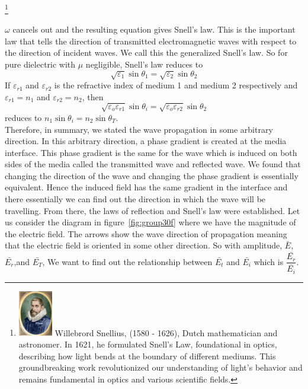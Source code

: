 \footnote{
\includegraphics[height=20mm]{graphics/snells} Willebrord Snellius, (1580 - 1626), Dutch mathematician and astronomer. In 1621, he formulated Snell's Law, foundational in optics, describing how light bends at the boundary of different mediums. This groundbreaking work revolutionized our understanding of light's behavior and remains fundamental in optics and various scientific fields.
}

$\omega$ cancels out and the resulting equation gives Snell's law. This is the important law that tells the direction of transmitted electromagnetic waves with respect to the direction of incident waves. We call this the generalized Snell's law. So for pure dielectric with $\mu$ negligible, Snell's law reduces to
$$\sqrt{\varepsilon_1}\sin\theta_1=\sqrt{\varepsilon_2}\sin\theta_2$$
\begin{equation}\end{equation}
If $\varepsilon_{r1}$ and $\varepsilon_{r2}$ is the refractive index of medium 1 and medium 2 respectively and $\varepsilon_{r1}=n_1$ and $\varepsilon_{r2}=n_2$, then
$$\sqrt{\varepsilon_o\varepsilon_{r1}}\sin\theta_i=\sqrt{\varepsilon_o\varepsilon_{r2}}\sin\theta_2$$
\begin{equation}\end{equation}
reduces to 
$n_1\sin\theta_i=n_2\sin\theta_T$. 
\begin{equation}\end{equation}
Therefore, in summary, we stated the wave propagation in some arbitrary direction. In this arbitrary direction, a phase gradient is created at the media interface. This phase gradient is the same for the wave which is induced on both sides of the media called the transmitted wave and reflected wave. We found that changing the direction of the wave and changing the phase gradient is essentially equivalent. Hence the induced field has the same gradient in the interface and there essentially we can find out the direction in which the wave will be travelling. From there, the laws of reflection and Snell's law were established. Let us consider the diagram in figure~\ref{fig:group30f} where we have the magnitude of the electric field. The arrows show the wave direction of propagation meaning that the electric field is oriented in some other direction. So with amplitude, $\bar{E}$, $\bar{E_r}$,and $\bar{E_T}$, We want to find out the relationship between $\bar{E_t}$ and $\bar{E_i}$ which is $\dfrac{\bar{E_r}}{\bar{E_i}}$.
